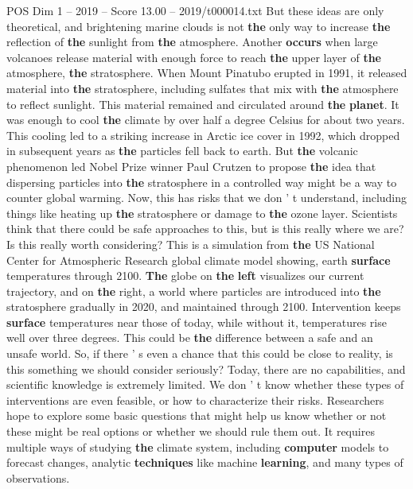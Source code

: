 \begin{textsample}{POS Dim 1 – 2019 – Score 13.00 – 2019/t000014.txt}
But these ideas are only theoretical, and brightening marine clouds is not \textbf{the} only way to increase \textbf{the} reflection of \textbf{the} sunlight from \textbf{the} atmosphere.
Another \textbf{occurs} when large volcanoes release material with enough force to reach \textbf{the} upper layer of \textbf{the} atmosphere, \textbf{the} stratosphere.
When Mount Pinatubo erupted in 1991, it released material into \textbf{the} stratosphere, including sulfates that mix with \textbf{the} atmosphere to reflect sunlight.
This material remained and circulated around \textbf{the} \textbf{planet}.
It was enough to cool \textbf{the} climate by over half a degree Celsius for about two years.
This cooling led to a striking increase in Arctic ice cover in 1992, which dropped in subsequent years as \textbf{the} particles fell back to earth.
But \textbf{the} volcanic phenomenon led Nobel Prize winner Paul Crutzen to propose \textbf{the} idea that dispersing particles into \textbf{the} stratosphere in a controlled way might be a way to counter global warming.
Now, this has risks that we don ' t understand, including things like heating up \textbf{the} stratosphere or damage to \textbf{the} ozone layer.
Scientists think that there could be safe approaches to this, but is this really where we are?
Is this really worth considering?
This is a simulation from \textbf{the} US National Center for Atmospheric Research global climate model showing, earth \textbf{surface} temperatures through 2100. \textbf{The} globe on \textbf{the} \textbf{left} visualizes our current trajectory, and on \textbf{the} right, a world where particles are introduced into \textbf{the} stratosphere gradually in 2020, and maintained through 2100.
Intervention keeps \textbf{surface} temperatures near those of today, while without it, temperatures rise well over three degrees.
This could be \textbf{the} difference between a safe and an unsafe world.
So, if there ' s even a chance that this could be close to reality, is this something we should consider seriously?
Today, there are no capabilities, and scientific knowledge is extremely limited.
We don ' t know whether these types of interventions are even feasible, or how to characterize their risks.
Researchers hope to explore some basic questions that might help us know whether or not these might be real options or whether we should rule them out.
It requires multiple ways of studying \textbf{the} climate system, including \textbf{computer} models to forecast changes, analytic \textbf{techniques} like machine \textbf{learning}, and many types of observations.

\end{textsample}
